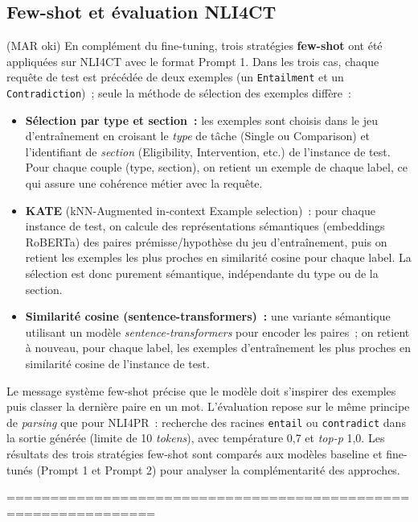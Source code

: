 \subsection{Few-shot et évaluation NLI4CT} (MAR oki)
En complément du fine-tuning, trois stratégies \textbf{few-shot} ont été appliquées sur NLI4CT avec le format Prompt 1. Dans les trois cas, chaque requête de test est précédée de deux exemples (un \texttt{Entailment} et un \texttt{Contradiction})~; seule la méthode de sélection des exemples diffère~:
\begin{itemize}
    \item \textbf{Sélection par type et section~:} les exemples sont choisis dans le jeu d'entraînement en croisant le \textit{type} de tâche (Single ou Comparison) et l'identifiant de \textit{section} (Eligibility, Intervention, etc.) de l'instance de test. Pour chaque couple (type, section), on retient un exemple de chaque label, ce qui assure une cohérence métier avec la requête.
    \item \textbf{KATE} (kNN-Augmented in-context Example selection)~: pour chaque instance de test, on calcule des représentations sémantiques (embeddings RoBERTa) des paires prémisse/hypothèse du jeu d'entraînement, puis on retient les exemples les plus proches en similarité cosine pour chaque label. La sélection est donc purement sémantique, indépendante du type ou de la section.
    \item \textbf{Similarité cosine (sentence-transformers)~:} une variante sémantique utilisant un modèle \textit{sentence-transformers} pour encoder les paires~; on retient à nouveau, pour chaque label, les exemples d'entraînement les plus proches en similarité cosine de l'instance de test.
\end{itemize}
Le message système few-shot précise que le modèle doit s'inspirer des exemples puis classer la dernière paire en un mot. L'évaluation repose sur le même principe de \textit{parsing} que pour NLI4PR~: recherche des racines \texttt{entail} ou \texttt{contradict} dans la sortie générée (limite de 10 \textit{tokens}), avec température 0,7 et \textit{top-p} 1,0. Les résultats des trois stratégies few-shot sont comparés aux modèles baseline et fine-tunés (Prompt 1 et Prompt 2) pour analyser la complémentarité des approches.

===============================================================